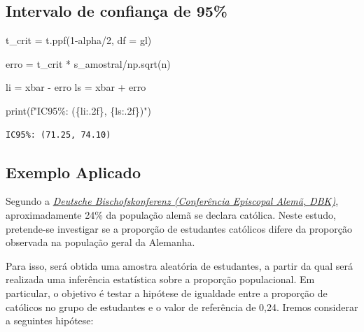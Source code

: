 \documentclass[
  letterpaper,
  DIV=11,
  numbers=noendperiod]{scrreprt}
\newenvironment{Shaded}{\begin{snugshade}}{\end{snugshade}}
\newcommand{\BuiltInTok}[1]{\textcolor[rgb]{0.00,0.23,0.31}{#1}}
\newcommand{\DecValTok}[1]{\textcolor[rgb]{0.68,0.00,0.00}{#1}}
\newcommand{\NormalTok}[1]{\textcolor[rgb]{0.00,0.23,0.31}{#1}}
\newcommand{\OperatorTok}[1]{\textcolor[rgb]{0.37,0.37,0.37}{#1}}
\newcommand{\SpecialCharTok}[1]{\textcolor[rgb]{0.37,0.37,0.37}{#1}}
\newcommand{\SpecialStringTok}[1]{\textcolor[rgb]{0.13,0.47,0.30}{#1}}
\begin{document}
\subsection{Intervalo de confiança de
95\%}\label{intervalo-de-confianuxe7a-de-95-1}

\begin{Shaded}
\begin{Highlighting}[]
\NormalTok{t\_crit }\OperatorTok{=}\NormalTok{ t.ppf(}\DecValTok{1}\OperatorTok{{-}}\NormalTok{alpha}\OperatorTok{/}\DecValTok{2}\NormalTok{, df }\OperatorTok{=}\NormalTok{ gl)}

\NormalTok{erro }\OperatorTok{=}\NormalTok{ t\_crit }\OperatorTok{*}\NormalTok{ s\_amostral}\OperatorTok{/}\NormalTok{np.sqrt(n)}

\NormalTok{li }\OperatorTok{=}\NormalTok{ xbar }\OperatorTok{{-}}\NormalTok{ erro}
\NormalTok{ls }\OperatorTok{=}\NormalTok{ xbar }\OperatorTok{+}\NormalTok{ erro}

\BuiltInTok{print}\NormalTok{(}\SpecialStringTok{f"IC95\%: (}\SpecialCharTok{\{}\NormalTok{li}\SpecialCharTok{:.2f\}}\SpecialStringTok{, }\SpecialCharTok{\{}\NormalTok{ls}\SpecialCharTok{:.2f\}}\SpecialStringTok{)"}\NormalTok{)}
\end{Highlighting}
\end{Shaded}

\begin{verbatim}
IC95%: (71.25, 74.10)
\end{verbatim}

\subsection{Exemplo Aplicado}\label{exemplo-aplicado-2}

Segundo a
\href{https://www.vaticannews.va/pt/igreja/news/2024-06/alemanha-igreja-catolica-dados-estatisticos.html}{\emph{Deutsche
Bischofskonferenz (Conferência Episcopal Alemã, DBK)}}, aproximadamente
24\% da população alemã se declara católica. Neste estudo, pretende-se
investigar se a proporção de estudantes católicos difere da proporção
observada na população geral da Alemanha.

Para isso, será obtida uma amostra aleatória de estudantes, a partir da
qual será realizada uma inferência estatística sobre a proporção
populacional. Em particular, o objetivo é testar a hipótese de igualdade
entre a proporção de católicos no grupo de estudantes e o valor de
referência de 0,24. Iremos considerar a seguintes hipótese:
\end{document}
